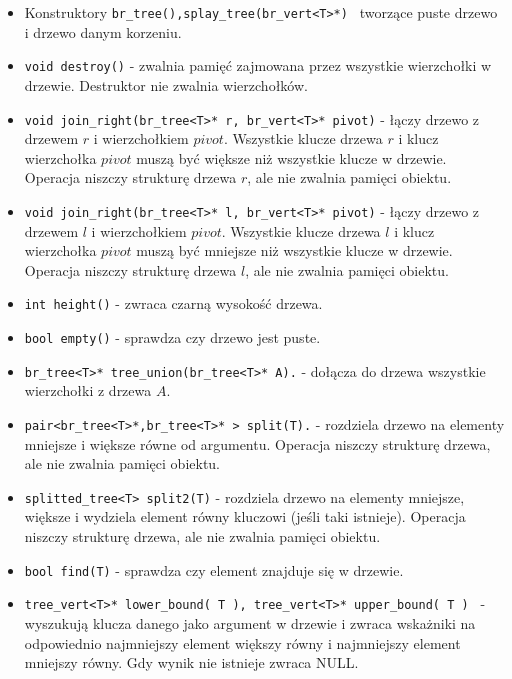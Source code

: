 \documentclass[declaration,shortabstract]{iithesis}
\theoremstyle{thm}
\theoremstyle{remark}
\theoremstyle{plain}
\theoremstyle{plain}
\theoremstyle{plain}
\begin{document}
\begin{itemize}

\item{Konstruktory \texttt{br\_tree(),splay\_tree(br\_vert<T>*) } tworzące puste drzewo i drzewo danym korzeniu.}

\item{\texttt{void destroy()} - zwalnia pamięć zajmowana przez wszystkie wierzchołki w drzewie. Destruktor nie zwalnia wierzchołków.}

\item{\texttt{void join\_right(br\_tree<T>* r, br\_vert<T>* pivot)} - łączy drzewo z drzewem $r$ i wierzchołkiem $pivot$. Wszystkie klucze drzewa $r$ i klucz wierzchołka $pivot$ muszą być większe niż wszystkie klucze w drzewie. Operacja niszczy strukturę drzewa $r$, ale nie zwalnia pamięci obiektu.}

\item{\texttt{void join\_right(br\_tree<T>* l, br\_vert<T>* pivot)} - łączy drzewo z drzewem $l$ i wierzchołkiem $pivot$. Wszystkie klucze drzewa $l$ i klucz wierzchołka $pivot$ muszą być mniejsze niż wszystkie klucze w drzewie. Operacja niszczy strukturę drzewa $l$, ale nie zwalnia pamięci obiektu.}

\item{\texttt{int height()} - zwraca czarną wysokość drzewa.}
 
\item{\texttt{bool empty()} - sprawdza czy drzewo jest puste.}

\item{\texttt{br\_tree<T>* tree\_union(br\_tree<T>* A).} - dołącza do drzewa wszystkie wierzchołki z drzewa $A$.}

\item{\texttt{pair<br\_tree<T>*,br\_tree<T>* > split(T).} - rozdziela drzewo na elementy mniejsze i większe równe od argumentu. Operacja niszczy strukturę drzewa, ale nie zwalnia pamięci obiektu.}

\item{\texttt{splitted\_tree<T> split2(T)} - rozdziela drzewo na elementy mniejsze, większe i wydziela element równy kluczowi (jeśli taki istnieje). Operacja niszczy strukturę drzewa, ale nie zwalnia pamięci obiektu.}

\item{\texttt{bool find(T)} - sprawdza czy element znajduje się w drzewie.}
    
\item{\texttt{tree\_vert<T>* lower\_bound( T ), tree\_vert<T>* upper\_bound( T ) } - wyszukują klucza danego jako argument w drzewie i zwraca wskażniki na odpowiednio najmniejszy element większy równy i najmniejszy element mniejszy równy. Gdy wynik nie istnieje zwraca NULL.}
   

\end{itemize}
\end{document}
